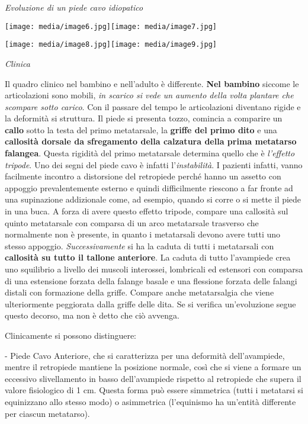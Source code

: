 \documentclass[]{article}
\begin{document}
\emph{Evoluzione di un piede cavo idiopatico }

\texttt{[image: media/image6.jpg]}\texttt{[image: media/image7.jpg]}

\texttt{[image: media/image8.jpg]}\texttt{[image: media/image9.jpg]}

\emph{Clinica}

Il quadro clinico nel bambino e nell'adulto è differente. \textbf{Nel
bambino} siccome le articolazioni sono mobili, \emph{in scarico si vede
un aumento della volta plantare che scompare sotto carico}. Con il
passare del tempo le articolazioni diventano rigide e la deformità si
struttura. Il piede si presenta tozzo, comincia a comparire un
\textbf{callo} sotto la testa del primo metatarsale, la \textbf{griffe
del primo dito} e una \textbf{callosità dorsale da sfregamento della
calzatura della prima metatarso falangea}. Questa rigidità del primo
metatarsale determina quello che è \emph{l'effetto tripode}. Uno dei
segni del piede cavo è infatti l'\emph{instabilità}. I pazienti infatti,
vanno facilmente incontro a distorsione del retropiede perché hanno un
assetto con appoggio prevalentemente esterno e quindi difficilmente
riescono a far fronte ad una supinazione addizionale come, ad esempio,
quando si corre o si mette il piede in una buca. A forza di avere questo
effetto tripode, compare una callosità sul quinto metatarsale con
comparsa di un arco metatarsale trasverso che normalmente non è
presente, in quanto i metatarsali devono avere tutti uno stesso
appoggio. \emph{Successivamente} si ha la caduta di tutti i metatarsali
con \textbf{callosità su tutto il tallone anteriore}. La caduta di tutto
l'avampiede crea uno squilibrio a livello dei muscoli interossei,
lombricali ed estensori con comparsa di una estensione forzata della
falange basale e una flessione forzata delle falangi distali con
formazione della griffe. Compare anche metatarsalgia che viene
ulteriormente peggiorata dalla griffe delle dita. Se si verifica
un'evoluzione segue questo decorso, ma non è detto che ciò avvenga.

Clinicamente si possono distinguere:

- Piede Cavo Anteriore, che si caratterizza per una deformità
dell'avampiede, mentre il retropiede mantiene la posizione normale, così
che si viene a formare un eccessivo slivellamento in basso
dell'avampiede rispetto al retropiede che supera il valore fisiologico
di 1 cm. Questa forma può essere simmetrica (tutti i metatarsi si
equinizzano allo stesso modo) o asimmetrica (l'equinismo ha un'entità
differente per ciascun metatarso).
\end{document}

